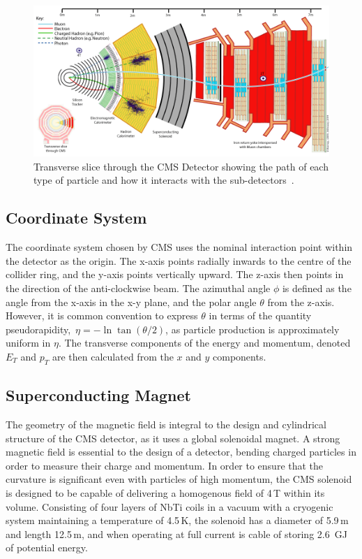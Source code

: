 \begin{figure}
\centering
\includegraphics[width=1.\textwidth]{Figures/Detector/CMS_Slice}
\caption[Transverse slice through the CMS Detector showing the path of each type of particle and how it interacts with the sub-detectors.]{Transverse slice through the CMS Detector showing the path of each type of particle and how it interacts with the sub-detectors~\cite{cmsslice}.}
\label{fig:CMS_Slice}
\end{figure}
\subsection{Coordinate System}

The coordinate system chosen by CMS uses the nominal interaction point within the detector as the origin. The x-axis points radially inwards to the centre of the collider ring, and the y-axis points vertically upward. The z-axis then points in the direction of the anti-clockwise beam. The azimuthal angle $\phi$ is defined as the angle from the x-axis in the x-y plane, and the polar angle $\theta$ from the z-axis. However, it is common convention to express $\theta$ in terms of the quantity pseudorapidity,~\begin{math}
\eta = -\ln \tan (\theta / 2) 
\end{math}, as particle production is approximately uniform in $\eta$. The transverse components of the energy and momentum, denoted $E_{T}$ and $p_{T}$ are then calculated from the $x$ and $y$ components. 



\subsection{Superconducting Magnet}

The geometry of the magnetic field is integral to the design and cylindrical structure of the CMS detector, as it uses a global solenoidal magnet. A strong magnetic field is essential to the design of a detector, bending charged particles in order to measure their charge and momentum. In order to ensure that the curvature is significant even with particles of high momentum, the CMS solenoid is designed to be capable of delivering a homogenous field of 4\,T within its volume. Consisting of four layers of NbTi coils in a vacuum with a cryogenic system maintaining a temperature of 4.5\,K, the solenoid has a diameter of 5.9\,m and length 12.5\,m, and when operating at full current is cable of storing 2.6~GJ of potential energy.

